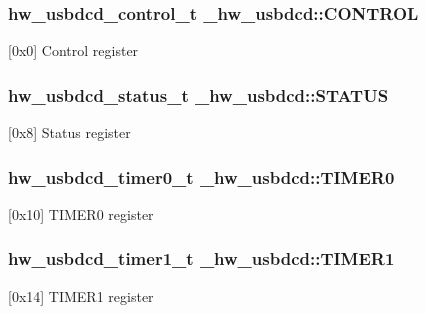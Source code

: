 \subsubsection[{\texorpdfstring{C\+O\+N\+T\+R\+OL}{CONTROL}}]{ {\bf hw\+\_\+usbdcd\+\_\+control\+\_\+t} \+\_\+hw\+\_\+usbdcd\+::\+C\+O\+N\+T\+R\+OL}\hypertarget{struct__hw__usbdcd_a511e70165ada6f6bce404f7e67b01eb3}{}\label{struct__hw__usbdcd_a511e70165ada6f6bce404f7e67b01eb3}
\mbox{[}0x0\mbox{]} Control register 
\subsubsection[{\texorpdfstring{S\+T\+A\+T\+US}{STATUS}}]{ {\bf hw\+\_\+usbdcd\+\_\+status\+\_\+t} \+\_\+hw\+\_\+usbdcd\+::\+S\+T\+A\+T\+US}\hypertarget{struct__hw__usbdcd_ae8291d0846f31f11fddd634ff490b87c}{}\label{struct__hw__usbdcd_ae8291d0846f31f11fddd634ff490b87c}
\mbox{[}0x8\mbox{]} Status register 
\subsubsection[{\texorpdfstring{T\+I\+M\+E\+R0}{TIMER0}}]{ {\bf hw\+\_\+usbdcd\+\_\+timer0\+\_\+t} \+\_\+hw\+\_\+usbdcd\+::\+T\+I\+M\+E\+R0}\hypertarget{struct__hw__usbdcd_ae5ff6451ffa4731fa90fc26d9e75e289}{}\label{struct__hw__usbdcd_ae5ff6451ffa4731fa90fc26d9e75e289}
\mbox{[}0x10\mbox{]} T\+I\+M\+E\+R0 register 
\subsubsection[{\texorpdfstring{T\+I\+M\+E\+R1}{TIMER1}}]{ {\bf hw\+\_\+usbdcd\+\_\+timer1\+\_\+t} \+\_\+hw\+\_\+usbdcd\+::\+T\+I\+M\+E\+R1}\hypertarget{struct__hw__usbdcd_ad63cc9e587f35c927ca09ff525f3ea97}{}\label{struct__hw__usbdcd_ad63cc9e587f35c927ca09ff525f3ea97}
\mbox{[}0x14\mbox{]} T\+I\+M\+E\+R1 register 
